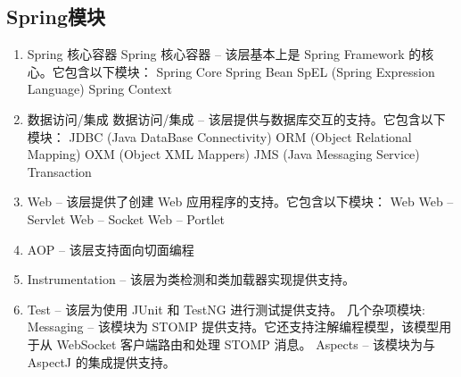 \documentclass[../../../interview-questions.tex]{subfiles}
\begin{document}
\subsection{Spring模块}

\begin{enumerate}
    \item {Spring 核心容器}
Spring 核心容器 – 该层基本上是 Spring Framework 的核心。它包含以下模块：
Spring Core
Spring Bean
SpEL (Spring Expression Language)
Spring Context
    \item{数据访问/集成}
数据访问/集成 – 该层提供与数据库交互的支持。它包含以下模块：
JDBC (Java DataBase Connectivity)
ORM (Object Relational Mapping)
OXM (Object XML Mappers)
JMS (Java Messaging Service)
Transaction
\item{Web – 该层提供了创建 Web 应用程序的支持。}它包含以下模块：
Web
Web – Servlet
Web – Socket
Web – Portlet
\item{AOP – 该层支持面向切面编程}
\item{Instrumentation – 该层为类检测和类加载器实现提供支持。}
\item{Test – 该层为使用 JUnit 和 TestNG 进行测试提供支持。}
几个杂项模块:
Messaging – 该模块为 STOMP 提供支持。它还支持注解编程模型，该模型用于从 WebSocket 客户端路由和处理 STOMP 消息。
Aspects – 该模块为与 AspectJ 的集成提供支持。
\end{enumerate}
\end{document}
